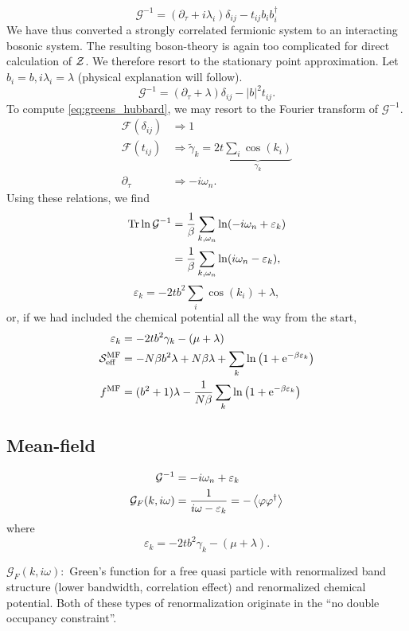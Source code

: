\begin{equation}
\mathcal{G}^{-1} = \left(\partial_\tau + i\lambda_i\right)\delta_{ij}-t_{ij}b_ib_i^\dagger
\end{equation}
We have thus converted a strongly correlated fermionic system to an interacting bosonic system. 
The resulting boson-theory is again too complicated for direct calculation of $\mathcal{Z}$. We therefore resort to the stationary point approximation.  Let $b_i = b, i\lambda_i = \lambda$ (physical explanation will follow).
\begin{equation}
\label{eq:greens_hubbard}
\mathcal{G}^{-1} = (\partial_\tau + \lambda)\delta_{ij}- |b|^2t_{ij}.
\end{equation}
To compute \eqref{eq:greens_hubbard}, we may resort to the Fourier transform of  $\mathcal{G}^{-1}$.
\begin{align*}
\mathcal{F}(\delta_{ij}) &\Rightarrow 1 \\
\mathcal{F}(t_{ij}) &\Rightarrow \tilde{\gamma}_k = 2t\underbrace{\sum_{i}\cos(k_i)}_{\gamma_k} \\
\partial_\tau &\Rightarrow -i\omega_n.
\end{align*}
Using these relations, we find 
\begin{align}
\Tr\ln\mathcal{G}^{-1} &= \frac{1}{\beta}\sum_{k,\omega_n}\ln(-i\omega_n + \varepsilon_k) \\
&= \frac{1}{\beta}\sum_{k,\omega_n}\ln(i\omega_n - \varepsilon_k),
\end{align}
\begin{equation}
\varepsilon_k = -2tb^2\sum_i\cos(k_i) + \lambda,
\end{equation}
or, if we had included the chemical potential all the way from the start,
\begin{align*}
\varepsilon_k &= -2tb^2\gamma_k-(\mu+\lambda) \\
\mathcal{S}_{\text{eff}}^{\text{MF}} &= -N\beta b^2 \lambda + N\beta \lambda+\sum_k\ln\left(1+\mathrm{e}^{-\beta \varepsilon_k}\right) \\
f^{\text{MF}} &= (b^2 + 1)\lambda - \frac{1}{N\beta}\sum_k\ln\left(1+\mathrm{e}^{-\beta\varepsilon_k}\right)
\end{align*}

\subsection{Mean-field}

\begin{align}
\mathcal{G}^{-1} &= -i\omega_n+\varepsilon_k \\
\mathcal{G}_F(k ,i\omega) &= \frac{1}{i\omega - \varepsilon_k} = -\ev{\varphi\varphi^\dagger}
\end{align}
where 
\begin{equation}
\varepsilon_k = -2tb^2\gamma_k-(\mu+\lambda).
\end{equation}

\(\mathcal{G}_F(k, i\omega):\) Green's function for a free quasi particle with renormalized band structure (lower bandwidth, correlation effect) and renormalized chemical potential. Both of these types of renormalization originate in the ``no double occupancy constraint''.




